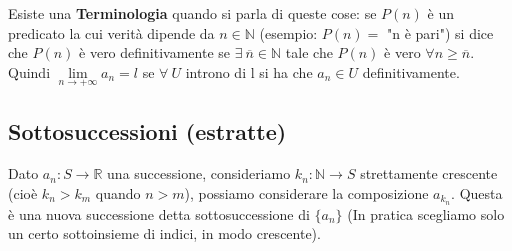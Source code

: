 Esiste una \textbf{Terminologia} quando si parla di queste cose: se $P(n)$ è un predicato la cui verità dipende da $n\in \mathbb{N}$ (esempio: $P(n) =$ "n è pari") si dice che $P(n)$ è vero definitivamente se $\exists \: \overline{n}\in \mathbb{N}$ tale che $P(n)$ è vero $\forall n \geq \overline{n}$.\\
Quindi $\lim\limits_{n\to +\infty} a_n = l$ se $\forall \: U$ introno di l si ha che $a_n \in U$ definitivamente.

\subsection{Sottosuccessioni (estratte)}
\begin{definition}[Sottosuccessione]
Dato $a_n: S \to \mathbb{R}$ una successione, consideriamo $k_n: \mathbb{N} \to S$ strettamente crescente (cioè $k_n > k_m$ quando $n>m$), possiamo considerare la composizione $a_{k_n}$. Questa è una nuova successione detta sottosuccessione di $\{a_n\}$ (In pratica scegliamo solo un certo sottoinsieme di indici, in modo crescente).
\end{definition}

